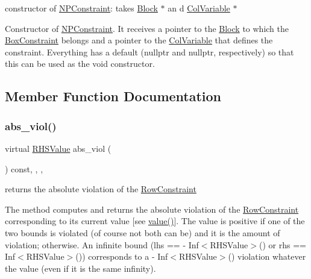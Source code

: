 constructor of \mbox{\hyperlink{class_s_m_spp__di__unipi__it_1_1_n_p_constraint}{N\+P\+Constraint}}\+: takes \mbox{\hyperlink{class_s_m_spp__di__unipi__it_1_1_block}{Block}} $\ast$ an d \mbox{\hyperlink{class_s_m_spp__di__unipi__it_1_1_col_variable}{Col\+Variable}} $\ast$ 

Constructor of \mbox{\hyperlink{class_s_m_spp__di__unipi__it_1_1_n_p_constraint}{N\+P\+Constraint}}. It receives a pointer to the \mbox{\hyperlink{class_s_m_spp__di__unipi__it_1_1_block}{Block}} to which the \mbox{\hyperlink{class_s_m_spp__di__unipi__it_1_1_box_constraint}{Box\+Constraint}} belongs and a pointer to the \mbox{\hyperlink{class_s_m_spp__di__unipi__it_1_1_col_variable}{Col\+Variable}} that defines the constraint. Everything has a default (nullptr and nullptr, respectively) so that this can be used as the void constructor. 

\subsection{Member Function Documentation}
\mbox{\label{class_s_m_spp__di__unipi__it_1_1_n_p_constraint_a1e06e555eab5078e4d5ec16745778984}} 
\subsubsection{\texorpdfstring{abs\+\_\+viol()}{abs\_viol()}}
{\footnotesize\ttfamily virtual \mbox{\hyperlink{class_s_m_spp__di__unipi__it_1_1_row_constraint_a8813536ab3b13a81c8e83a999ade3bd8}{R\+H\+S\+Value}} abs\+\_\+viol (\begin{DoxyParamCaption}\item[{void}]{ }\end{DoxyParamCaption}) const\hspace{0.3cm}{\ttfamily [inline]}, {\ttfamily [final]}, {\ttfamily [override]}, {\ttfamily [virtual]}}



returns the absolute violation of the \mbox{\hyperlink{class_s_m_spp__di__unipi__it_1_1_row_constraint}{Row\+Constraint}} 

The method computes and returns the absolute violation of the \mbox{\hyperlink{class_s_m_spp__di__unipi__it_1_1_row_constraint}{Row\+Constraint}} corresponding to its current value \mbox{[}see \mbox{\hyperlink{class_s_m_spp__di__unipi__it_1_1_one_var_constraint_ad9256be16b98f3b557f54fa5e2118db7}{value()}}\mbox{]}. The value is positive if one of the two bounds is violated (of course not both can be) and it is the amount of violation; otherwise. An infinite bound (lhs == -\/ Inf$<$\+R\+H\+S\+Value$>$() or rhs == Inf$<$\+R\+H\+S\+Value$>$()) corresponds to a -\/ Inf$<$\+R\+H\+S\+Value$>$() violation whatever the value (even if it is the same infinity).

